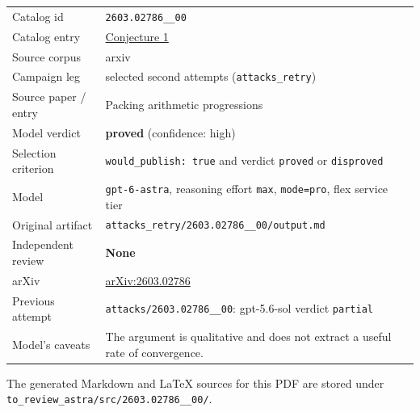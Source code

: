 \documentclass[
  11pt,
  a4paper,
]{article}
\newcounter{none} %
\begin{document}
{\def\LTcaptype{none} %
\begin{longtable}[]{@{}
  >{\raggedright\arraybackslash}p{}
  >{\raggedright\arraybackslash}p{}@{}}
\toprule\noalign{}
\endhead
\bottomrule\noalign{}
\endlastfoot
Catalog id & \texttt{2603.02786\_\_00} \\
Catalog entry &
\href{https://graph-theory-ai.github.io/graph-conjectures/arxiv/2603.02786__00/}{Conjecture
1} \\
Source corpus & arxiv \\
Campaign leg & selected second attempts (\texttt{attacks\_retry}) \\
Source paper / entry & Packing arithmetic progressions \\
Model verdict & \textbf{proved} (confidence: high) \\
Selection criterion & \texttt{would\_publish:\ true} and verdict
\texttt{proved} or \texttt{disproved} \\
Model & \texttt{gpt-6-astra}, reasoning effort \texttt{max},
\texttt{mode=pro}, flex service tier \\
Original artifact &
\texttt{attacks\_retry/2603.02786\_\_00/output.md} \\
Independent review & \textbf{None} \\
arXiv & \href{https://arxiv.org/abs/2603.02786}{arXiv:2603.02786} \\
Previous attempt & \texttt{attacks/2603.02786\_\_00}: gpt-5.6-sol
verdict \texttt{partial} \\
Model's caveats & The argument is qualitative and does not extract a
useful rate of convergence. \\
\end{longtable}
}

The generated Markdown and LaTeX sources for this PDF are stored under
\texttt{to\_review\_astra/src/2603.02786\_\_00/}.
\end{document}
